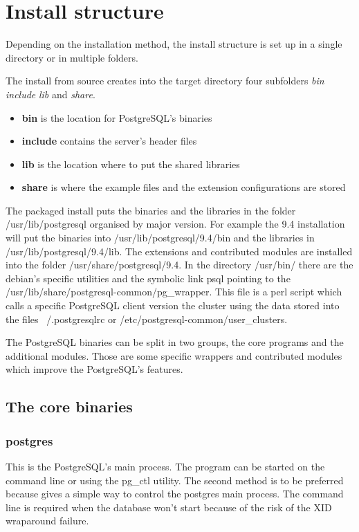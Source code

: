 \chapter{Install structure}\label{cha:INSTALLSTRUCT}
Depending on the installation method, the install structure is set up in a single directory or 
in multiple folders.\newline

The install from source creates into the target directory four subfolders \textit{bin} 
\textit{include} \textit{lib} and \textit{share}.

\begin{itemize}
 \item \textbf{bin} is the location for PostgreSQL's binaries
 \item \textbf{include} contains the server's header files
 \item \textbf{lib} is the location where to put the shared libraries
 \item \textbf{share} is where the example files and the extension configurations are stored
\end{itemize}


The packaged install puts the binaries and the libraries in the folder /usr/lib/postgresql 
organised by major version. For example the 9.4 installation will put the binaries into 
/usr/lib/postgresql/9.4/bin and the libraries in /usr/lib/postgresql/9.4/lib. The extensions and 
contributed modules are installed into the folder /usr/share/postgresql/9.4. In the directory /usr/bin/ 
there are the debian's specific utilities and the symbolic link psql pointing to the \newline
/usr/lib/share/postgresql-common/pg\_wrapper. This file is a perl script which calls a specific PostgreSQL 
client version the cluster using the data stored into the files ~/.postgresqlrc or\newline
/etc/postgresql-common/user\_clusters.\newline

The PostgreSQL binaries can be split in two groups, the core programs and the additional modules.
Those are some specific wrappers and contributed modules which improve the PostgreSQL's features. 

\section{The core binaries}

\subsection{postgres}
\label{sec:POSTGRES}
This is the PostgreSQL's main process. The program can be started on the command line or using the pg\_ctl 
utility. The second method is to be preferred because gives a simple way to control the postgres 
main process. The command line is required when the database won't start because of the risk of the 
XID wraparound failure. 

